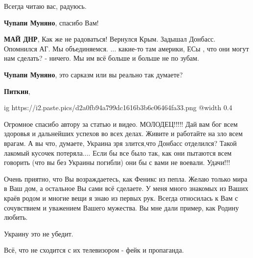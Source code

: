  
 
 
 
 
\zzSecCmt

\begin{itemize} %

Всегда читаю вас, радуюсь.

\begin{itemize} %
\textbf{Чупапи Муняно}, спасибо Вам!

\textbf{МАЙ ДНР}, Как же не радоваться! Вернулся Крым. Задышал Донбасс. Опомнился АГ. Мы объединяемся. ... какие-то там америки, ЕСы , что они могут нам сделать? - ничего. Мы им всё больше и больше не по зубам.

\textbf{Чупапи Муняно}, это сарказм или вы реально так думаете?

\textbf{Питкин},

\ifcmt
  ig https://i2.paste.pics/d2a0fb94a799dc1616b3b6c06464fa33.png
  @width 0.4
\fi

\end{itemize} %


Огромное спасибо автору за статью и видео. МОЛОДЕЦ!!!!! Дай вам бог всем
здоровья и дальнейших успехов во всех делах. Живите и работайте на зло всем
врагам. А вы что, думаете, Украина зря злится,что Донбасс отделился? Такой
лакомый кусочек потеряла.... Если бы все было так, как они пытаются всем
говорить (что вы без Украины погибли) они бы с вами не воевали. Удачи!!!


Очень приятно, что Вы возраждаетесь, как Феникс из пепла. Желаю только мира в
Ваш дом, а остальное Вы сами всё сделаете. У меня много знакомых из Ваших краёв
родом и многие вещи я знаю из первых рук. Всегда относилась к Вам с сочувствием
и уважением Вашего мужества. Вы мне дали пример, как Родину любить.


Украину это не убедит.

Всё, что не сходится с их телевизором - фейк и пропаганда.


\end{itemize}

